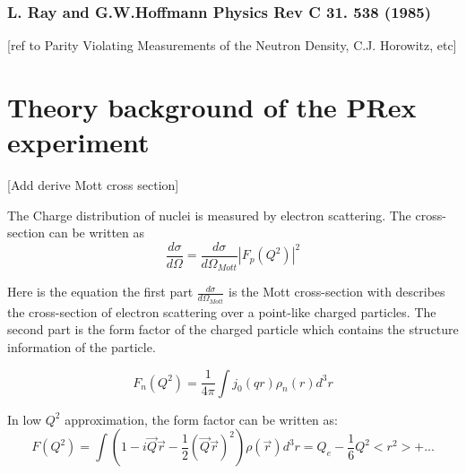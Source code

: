 \subsubsection{L. Ray and G.W.Hoffmann Physics Rev C 31. 538 (1985)}

[ref to Parity Violating Measurements of the Neutron Density, C.J. Horowitz, etc]

\section{Theory background of the PRex experiment}
[Add derive Mott cross section]

The Charge distribution of nuclei is measured by electron scattering. The cross-section can be written as
\begin{equation}
    \frac{d\sigma}{d\Omega} = \frac{d\sigma}{d\Omega_{Mott}}|F_p(Q^2)|^2
\end{equation}

Here is the equation the first part $\frac{d\sigma}{d\Omega_{Mott}}$ is the Mott cross-section with describes the cross-section of electron scattering over a point-like charged particles. The second part is the form factor of the charged particle which contains the structure information of the particle. 


\begin{equation}
    F_n(Q^2) = \frac{1}{4\pi}\int{j_0(qr)\rho_n(r)}d^3r
\end{equation}

In low $Q^2$ approximation, the form factor can be written as:
\begin{equation}
    F(Q^2) = \int{(1-i\Vec{Q}\Vec{r} - \frac{1}{2}(\Vec{Q}\Vec{r})^2)\rho(\Vec{r})}d^3r = Q_e - \frac{1}{6}Q^2<r^2> + ...
\end{equation}





